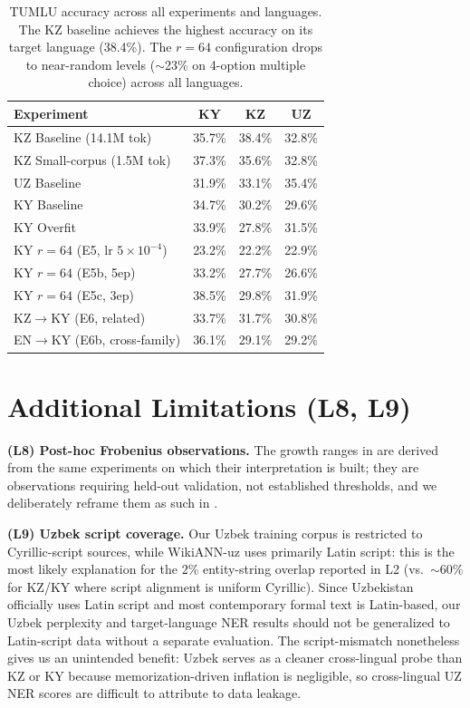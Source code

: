 \documentclass[11pt]{article}
\begin{document}
\begin{table}[!htbp]
\centering
\small
\begin{tabular}{lccc}
\toprule
\textbf{Experiment} & \textbf{KY} & \textbf{KZ} & \textbf{UZ} \\
\midrule
KZ Baseline (14.1M tok) & 35.7\% & 38.4\% & 32.8\% \\
KZ Small-corpus (1.5M tok) & 37.3\% & 35.6\% & 32.8\% \\
UZ Baseline & 31.9\% & 33.1\% & 35.4\% \\
KY Baseline & 34.7\% & 30.2\% & 29.6\% \\
KY Overfit & 33.9\% & 27.8\% & 31.5\% \\
KY $r{=}64$ (E5, lr $5{\times}10^{-4}$) & 23.2\% & 22.2\% & 22.9\% \\
KY $r{=}64$ (E5b, 5ep) & 33.2\% & 27.7\% & 26.6\% \\
KY $r{=}64$ (E5c, 3ep) & 38.5\% & 29.8\% & 31.9\% \\
KZ$\rightarrow$KY (E6, related) & 33.7\% & 31.7\% & 30.8\% \\
EN$\rightarrow$KY (E6b, cross-family) & 36.1\% & 29.1\% & 29.2\% \\
\bottomrule
\end{tabular}
\caption{TUMLU accuracy across all experiments and languages. The KZ baseline achieves the highest accuracy on its target language (38.4\%). The $r{=}64$ configuration drops to near-random levels ($\sim$23\% on 4-option multiple choice) across all languages.}
\label{tab:tumlu_full}
\end{table}

\section{Additional Limitations (L8, L9)}
\label{app:add_limitations}

\textbf{(L8) Post-hoc Frobenius observations.} The growth ranges in  are derived from the same experiments on which their interpretation is built; they are observations requiring held-out validation, not established thresholds, and we deliberately reframe them as such in .

\textbf{(L9) Uzbek script coverage.} Our Uzbek training corpus is restricted to Cyrillic-script sources, while WikiANN-uz uses primarily Latin script: this is the most likely explanation for the $2\%$ entity-string overlap reported in L2 (vs.\ $\sim 60\%$ for KZ/KY where script alignment is uniform Cyrillic). Since Uzbekistan officially uses Latin script and most contemporary formal text is Latin-based, our Uzbek perplexity and target-language NER results should not be generalized to Latin-script data without a separate evaluation. The script-mismatch nonetheless gives us an unintended benefit: Uzbek serves as a cleaner cross-lingual probe than KZ or KY because memorization-driven inflation is negligible, so cross-lingual UZ NER scores are difficult to attribute to data leakage.
\end{document}
